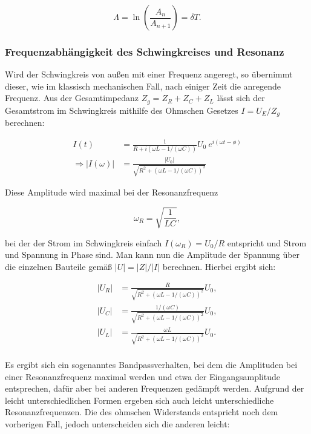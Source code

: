 \documentclass{article}
\begin{document}
\begin{equation}
    \Lambda = \ln{\left( \frac{A_n}{A_{n+1}} \right)} = \delta T.
\end{equation}

\subsubsection{Frequenzabhängigkeit des Schwingkreises und Resonanz}

Wird der Schwingkreis von außen mit einer Frequenz angeregt, so übernimmt dieser, wie im klassisch mechanischen Fall, nach einiger Zeit die anregende Frequenz. Aus der Gesamtimpedanz $Z_g = Z_R + Z_C + Z_L$ lässt sich der Gesamtstrom im Schwingkreis mithilfe des Ohmschen Gesetzes $I = U_E / Z_g$ berechnen:

\begin{equation}
    \begin{split}
        I(t) &= \frac{1}{R + i (\omega L - 1/(\omega C))} U_0 \ e^{i (\omega t - \phi)} \\
        \Rightarrow |I(\omega)| &= \frac{|U_0|}{\sqrt{R^2 + (\omega L - 1/(\omega C))^2}}
    \end{split}
\end{equation}

Diese Amplitude wird maximal bei der Resonanzfrequenz

\begin{equation}
    \omega_R = \sqrt{\frac{1}{LC}},
\end{equation}

bei der der Strom im Schwingkreis einfach $I(\omega_R) = U_0 / R$ entspricht und Strom und Spannung in Phase sind. Man kann nun die Amplitude der Spannung über die einzelnen Bauteile gemäß $|U| = |Z|/|I|$ berechnen. Hierbei ergibt sich:

\begin{equation}
    \begin{split}
        |U_R| &= \frac{R}{\sqrt{R^2 + (\omega L - 1/(\omega C))^2}} U_0, \\
        |U_C| &= \frac{1/(\omega C)}{\sqrt{R^2 + (\omega L - 1/(\omega C))^2}} U_0, \\
        |U_L| &= \frac{\omega L}{\sqrt{R^2 + (\omega L - 1/(\omega C))^2}} U_0. \\
    \end{split}
\end{equation}

Es ergibt sich ein sogenanntes Bandpassverhalten, bei dem die Amplituden bei einer Resonanzfrequenz maximal werden und etwa der Eingangsamplitude entsprechen, dafür aber bei anderen Frequenzen gedämpft werden. Aufgrund der leicht unterschiedlichen Formen ergeben sich auch leicht unterschiedliche Resonanzfrequenzen. Die des ohmschen Widerstands entspricht noch dem vorherigen Fall, jedoch unterscheiden sich die anderen leicht:
\end{document}

